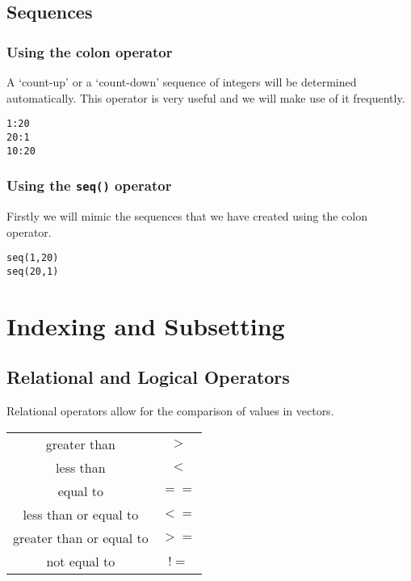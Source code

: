 \documentclass[a4paper,12pt]{article}
\begin{document}
\subsection{Sequences}
\subsubsection{Using the colon operator}
A `count-up' or a `count-down' sequence of integers will be determined automatically. This operator is very useful and we will make use of it frequently.
\begin{framed}
\begin{verbatim}
1:20
20:1
10:20
\end{verbatim}
\end{framed}
\subsubsection{Using the \texttt{seq()} operator}
Firstly we will mimic the sequences that we have created using the colon operator.
\begin{verbatim}
seq(1,20)
seq(20,1)
\end{verbatim}




\section{Indexing and Subsetting }
\subsection{Relational and Logical Operators}

Relational operators allow for the comparison of values in vectors.
\begin{center}
\begin{tabular}{|c|c|}
  \hline
greater than &	$>$\\
less than&	$<$\\
equal to	&$==$\\
less than or equal to&	$<=$\\
greater than or equal to&	$>=$\\
not equal to	&$!=$\\
  \hline
\end{tabular}
\end{center}
\end{document}
